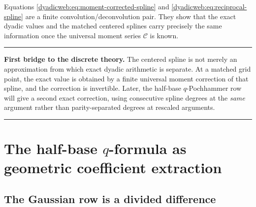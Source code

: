 \documentclass[11pt,oneside]{article}
\theoremstyle{definition}
\theoremstyle{remark}
\newenvironment{boxedremark}{%
  \par\smallskip\noindent\begin{center}\begin{minipage}{0.94\textwidth}%
  \color{black}\hrule\vspace{0.6em}\small
}{%
  \vspace{0.6em}\hrule\end{minipage}\end{center}\smallskip
}
\begin{document}
Equations \eqref{dyadicweb:eq:moment-corrected-spline} and \eqref{dyadicweb:eq:reciprocal-spline} are a finite
convolution/deconvolution pair.  They show that the exact dyadic values and the matched centered
splines carry precisely the same information once the universal moment series $\mathscr C$ is
known.

\begin{boxedremark}
\textbf{First bridge to the discrete theory.}
The centered spline is not merely an approximation from which exact dyadic arithmetic is
separate.  At a matched grid point, the exact value is obtained by a finite universal moment
correction of that spline, and the correction is invertible.  Later, the half-base
$q$-Pochhammer row will give a second exact correction, using consecutive spline degrees at
the \emph{same} argument rather than parity-separated degrees at rescaled arguments.
\end{boxedremark}

\section[The half-base q-formula as geometric coefficient extraction]{The half-base $q$-formula as geometric coefficient extraction}
\label{dyadicweb:sec:q-extraction}

\subsection{The Gaussian row is a divided difference}
\end{document}
